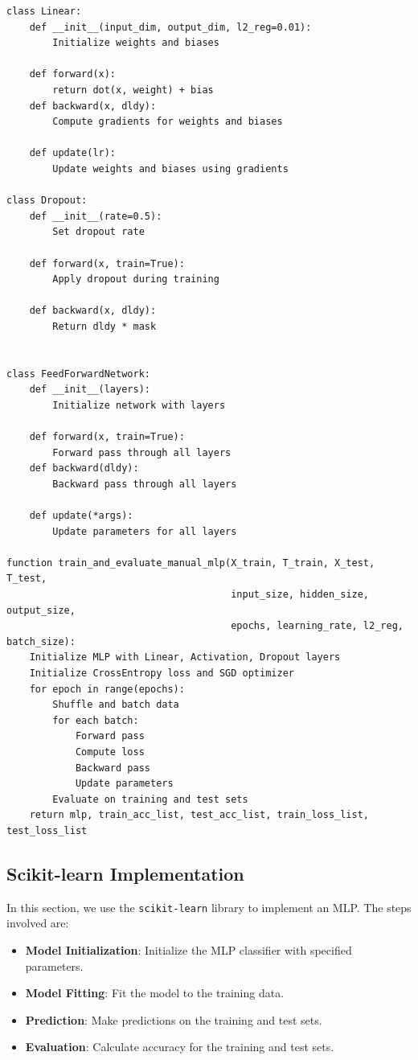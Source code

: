 \documentclass[a4paper,12pt]{article}
\begin{document}
\begin{verbatim}
class Linear:
    def __init__(input_dim, output_dim, l2_reg=0.01):
        Initialize weights and biases

    def forward(x):
        return dot(x, weight) + bias
    def backward(x, dldy):
        Compute gradients for weights and biases

    def update(lr):
        Update weights and biases using gradients

class Dropout:
    def __init__(rate=0.5):
        Set dropout rate

    def forward(x, train=True):
        Apply dropout during training

    def backward(x, dldy):
        Return dldy * mask


class FeedForwardNetwork:
    def __init__(layers):
        Initialize network with layers

    def forward(x, train=True):
        Forward pass through all layers
    def backward(dldy):
        Backward pass through all layers

    def update(*args):
        Update parameters for all layers

function train_and_evaluate_manual_mlp(X_train, T_train, X_test, T_test, 
                                       input_size, hidden_size, output_size,
                                       epochs, learning_rate, l2_reg, batch_size):
    Initialize MLP with Linear, Activation, Dropout layers
    Initialize CrossEntropy loss and SGD optimizer
    for epoch in range(epochs):
        Shuffle and batch data
        for each batch:
            Forward pass
            Compute loss
            Backward pass
            Update parameters
        Evaluate on training and test sets
    return mlp, train_acc_list, test_acc_list, train_loss_list, test_loss_list
\end{verbatim}

\subsection{Scikit-learn Implementation}
In this section, we use the \texttt{scikit-learn} library to implement an MLP. The steps involved are:

\begin{itemize}
    \item \textbf{Model Initialization}: Initialize the MLP classifier with specified parameters.
    \item \textbf{Model Fitting}: Fit the model to the training data.
    \item \textbf{Prediction}: Make predictions on the training and test sets.
    \item \textbf{Evaluation}: Calculate accuracy for the training and test sets.
\end{itemize}
\end{document}
